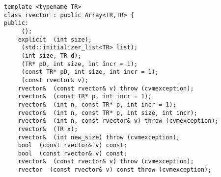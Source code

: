 \bigskip
\noindent%
\verb"template <typename TR>"\\
\verb"class rvector : public Array<TR,TR> {"\\
\verb"public:"\\
\verb"    "\verb" ();"\\
\verb"    explicit "\verb" (int size);"\\
\verb"    "\verb" (std::initializer_list<TR> list);"\\
\verb"    "\verb" (int size, TR d);"\\
\verb"    "\verb" (TR* pD, int size, int incr = 1);"\\
\verb"    "\verb" (const TR* pD, int size, int incr = 1);"\\
\verb"    "\verb" (const rvector& v);"\\
\verb"    rvector& "\verb" (const rvector& v) throw (cvmexception);"\\
\verb"    rvector& "\verb" (const TR* p, int incr = 1);"\\
\verb"    rvector& "\verb" (int n, const TR* p, int incr = 1);"\\
\verb"    rvector& "\verb" (int n, const TR* p, int size, int incr);"\\
\verb"    rvector& "\verb" (int n, const rvector& v) throw (cvmexception);"\\
\verb"    rvector& "\verb" (TR x);"\\
\verb"    rvector& "\verb" (int new_size) throw (cvmexception);"\\
\verb"    bool "\verb" (const rvector& v) const;"\\
\verb"    bool "\verb" (const rvector& v) const;"\\
\verb"    rvector& "\verb" (const rvector& v) throw (cvmexception);"\\
\verb"    rvector "\verb" (const rvector& v) const throw (cvmexception);"\\
